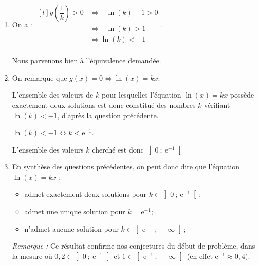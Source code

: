 \documentclass[10pt]{article}
\providecommand{\e}{{\mathrm{e}}}
\begin{document}
\begin{enumerate}
\begin{enumerate}
\item On a :
$\begin{aligned}[t] g\left(\dfrac 1k\right) > 0 &\iff -\ln(k) - 1 > 0\\
&\iff -\ln (k) >  1\\
&\iff \ln(k) < -1 \\ \end{aligned}$.

Nous parvenons bien à l'équivalence demandée.

\item On remarque que $g(x) = 0 \iff \ln(x) = kx$.

L'ensemble des valeurs de $k$ pour lesquelles l'équation $\ln (x) = kx$ possède exactement deux solutions est donc constitué des nombres $k$ vérifiant $\ln(k) < -1$, d'après la question précédente.

$\ln(k) < -1 \iff k < \e^{-1}$.

L'ensemble des valeurs $k$ cherché est donc $\left]0~;~\e^{-1}\right[ $
	\item En synthèse des questions précédentes, on peut donc dire que  l'équation $\ln (x) = kx$ :
			\begin{itemize}
				\item admet exactement deux solutions pour $ k\in \left]0~;~\e^{-1}\right[$;
				\item admet une unique solution pour $ k = \e^{-1}$;
				\item n'admet aucune solution pour $ k\in \left]\e^{-1}~;~+\infty\right[$;
			\end{itemize}
		\emph{Remarque :} Ce résultat confirme nos conjectures du début de problème, dans la mesure où $0,2 \in \left]0~;~\e^{-1}\right[$ et $1\in \left]\e^{-1}~;~+\infty\right[$ (en effet $\e^{-1}\approx 0,4)$.
		\end{enumerate}
	\end{enumerate}

	\medskip
\end{document}
